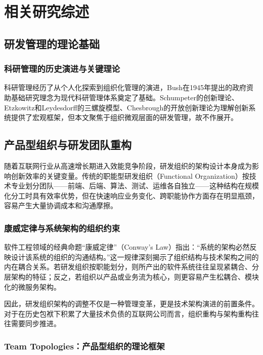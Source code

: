 
\chapter{相关研究综述}

\section{研发管理的理论基础}

\subsection{科研管理的历史演进与关键理论}

科研管理经历了从个人化探索到组织化管理的演进，Bush\cite{bush1945science}在1945年提出的政府资助基础研究理念为现代科研管理体系奠定了基础。Schumpeter\cite{schumpeter1934theory}的创新理论、Etzkowitz和Leydesdorff\cite{etzkowitz1995triple}的三螺旋模型、Chesbrough\cite{chesbrough2003open}的开放创新理论为理解创新系统提供了宏观框架，但本文聚焦于组织微观层面的研发管理，故不作展开。

\section{产品型组织与研发团队重构}

随着互联网行业从高速增长期进入效能竞争阶段，研发组织的架构设计本身成为影响创新效率的关键变量。传统的职能型研发组织（Functional Organization）按技术专业划分团队——前端、后端、算法、测试、运维各自独立——这种结构在规模化分工时具有效率优势，但在快速响应业务变化、跨职能协作方面存在明显瓶颈，容易产生大量协调成本和沟通摩擦。

\subsection{康威定律与系统架构的组织约束}

软件工程领域的经典命题“康威定律”（Conway's Law）\cite{conway1968law}指出：“系统的架构必然反映设计该系统的组织的沟通结构。”这一规律深刻揭示了组织结构与技术架构之间的内在耦合关系。若研发组织按职能划分，则所产出的软件系统往往呈现紧耦合、分层架构的特征；反之，若组织以产品或业务流为核心，则更容易产生松耦合、模块化的微服务架构。

因此，研发组织架构的调整不仅是一种管理变革，更是技术架构演进的前置条件。对于在历史包袱下积累了大量技术负债的互联网公司而言，组织重构与架构重构往往需要同步推进。

\subsection{Team Topologies：产品型组织的理论框架}

